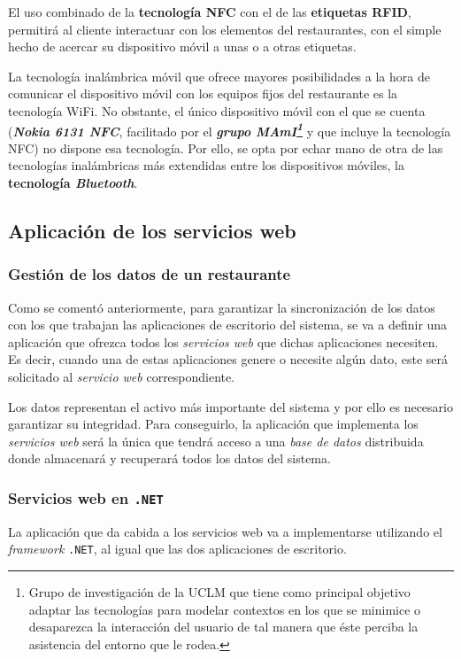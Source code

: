   El uso combinado de la \textbf{tecnología \acs{NFC}} con el de las
  \textbf{etiquetas \acs{RFID}}, permitirá al cliente interactuar con los
  elementos del restaurantes, con el simple hecho de acercar su dispositivo
  móvil a unas o a otras etiquetas.

  La tecnología inalámbrica móvil que ofrece mayores posibilidades a la hora
  de comunicar el dispositivo móvil con los equipos fijos del restaurante es
  la tecnología \acs{WiFi}. No obstante, el único dispositivo móvil con el que
  se cuenta (\emph{\textbf{Nokia 6131 \acs{NFC}}}, facilitado por el
  \textbf{\emph{grupo \acs{MAmI}\footnote{Grupo de investigación de la
  \acs{UCLM} que tiene como principal objetivo adaptar las tecnologías para 
  modelar contextos en los que se minimice o desaparezca la interacción del 
  usuario de tal manera que éste perciba la asistencia del entorno que le 
  rodea.}}} y que incluye la tecnología \acs{NFC}) no
  dispone esa tecnología. Por ello, se opta por echar mano de otra de las
  tecnologías inalámbricas más extendidas entre los dispositivos móviles, la
  \textbf{tecnología \emph{Bluetooth}}.

  \subsection{Aplicación de los servicios web}
    \subsubsection{Gestión de los datos de un restaurante}
  Como se comentó anteriormente, para garantizar la sincronización de los
datos con los que trabajan las aplicaciones de escritorio del sistema, se va a
definir una aplicación que ofrezca todos los \emph{servicios web} que dichas
aplicaciones necesiten. Es decir, cuando una de estas aplicaciones genere o
necesite algún dato, este será solicitado al \emph{servicio web}
correspondiente.

  Los datos representan el activo más importante del sistema y por ello es
necesario garantizar su integridad. Para conseguirlo, la aplicación que
implementa los \emph{servicios web} será la única que tendrá acceso a una
\emph{base de datos} distribuida donde almacenará y recuperará todos los datos
del sistema.

    \subsubsection{Servicios web en \texttt{.NET}}
La aplicación que da cabida a los servicios web va a implementarse utilizando
el \emph{framework} \texttt{.NET}, al igual que las dos aplicaciones de
escritorio.

